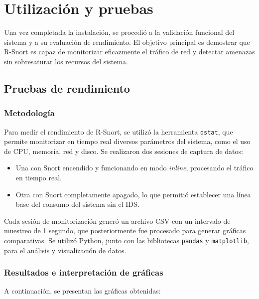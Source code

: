 \documentclass[11pt,a4paper,twoside]{report}
\begin{document}
\pagebreak



\section{Utilización y pruebas}

Una vez completada la instalación, se procedió a la validación funcional del sistema y a su evaluación de rendimiento. El objetivo principal es demostrar que R-Snort es capaz de monitorizar eficazmente el tráfico de red y detectar amenazas sin sobresaturar los recursos del sistema.

\subsection{Pruebas de rendimiento}

\subsubsection{Metodología}

Para medir el rendimiento de R-Snort, se utilizó la herramienta \texttt{dstat}, que permite monitorizar en tiempo real diversos parámetros del sistema, como el uso de CPU, memoria, red y disco. Se realizaron dos sesiones de captura de datos:

\begin{itemize}
	\item Una con Snort encendido y funcionando en modo \textit{inline}, procesando el tráfico en tiempo real.
	\item Otra con Snort completamente apagado, lo que permitió establecer una línea base del consumo del sistema sin el IDS.
\end{itemize}

Cada sesión de monitorización generó un archivo CSV con un intervalo de muestreo de 1 segundo, que posteriormente fue procesado para generar gráficas comparativas. Se utilizó Python, junto con las bibliotecas \texttt{pandas} y \texttt{matplotlib}, para el análisis y visualización de datos.

\subsubsection{Resultados e interpretación de gráficas}

A continuación, se presentan las gráficas obtenidas:
\end{document}
